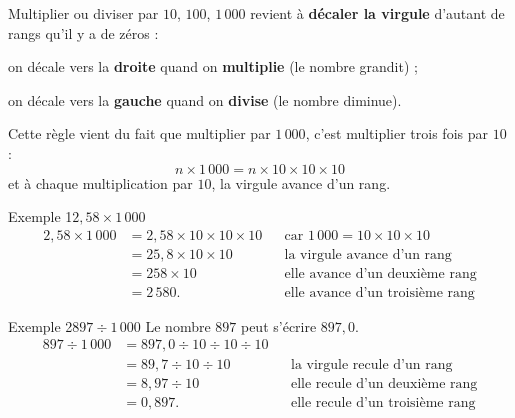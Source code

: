 \begin{astuce}
Multiplier ou diviser par $10$, $100$, $1\,000$ revient à \textbf{décaler la virgule}
d'autant de rangs qu'il y a de zéros :
\begin{compactitem}
\item on décale vers la \textbf{droite} quand on \textbf{multiplie} (le nombre grandit) ;
\item on décale vers la \textbf{gauche} quand on \textbf{divise} (le nombre diminue).
\end{compactitem}
\end{astuce}

\begin{theorie}
Cette règle vient du fait que multiplier par $1\,000$, c'est multiplier trois fois
par $10$ :
\[ n \times 1\,000 = n \times 10 \times 10 \times 10 \]
et à chaque multiplication par $10$, la virgule avance d'un rang.
\end{theorie}

\begin{exemple}{Exemple 1}{$2{,}58 \times 1\,000$}
\begin{align*}
  2{,}58 \times 1\,000 &= 2{,}58 \times 10 \times 10 \times 10 &&\text{car } 1\,000 = 10 \times 10 \times 10 \\
                       &= 25{,}8 \times 10 \times 10           &&\text{la virgule avance d'un rang} \\
                       &= 258 \times 10                        &&\text{elle avance d'un deuxième rang} \\
                       &= 2\,580.                              &&\text{elle avance d'un troisième rang}
\end{align*}
\end{exemple}

\begin{exemple}{Exemple 2}{$897 \div 1\,000$}
Le nombre $897$ peut s'écrire $897{,}0$.
\begin{align*}
  897 \div 1\,000 &= 897{,}0 \div 10 \div 10 \div 10 \\
                  &= 89{,}7 \div 10 \div 10 &&\text{la virgule recule d'un rang} \\
                  &= 8{,}97 \div 10         &&\text{elle recule d'un deuxième rang} \\
                  &= 0{,}897.               &&\text{elle recule d'un troisième rang}
\end{align*}
\end{exemple}

